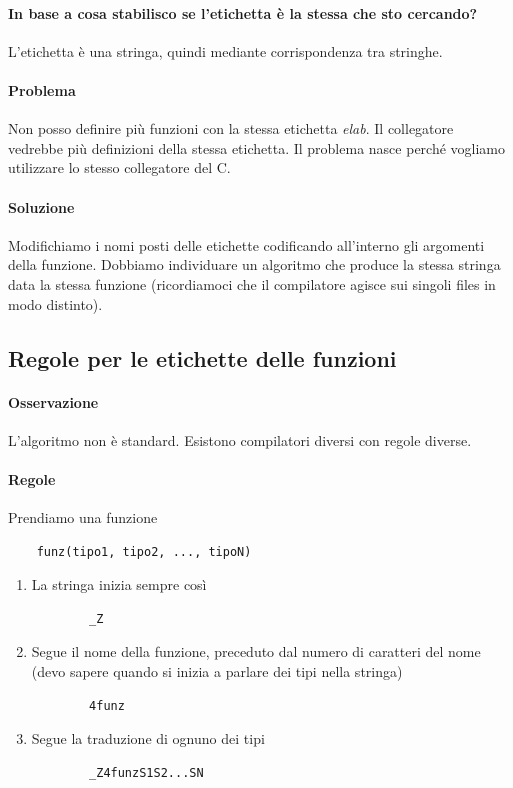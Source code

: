 \paragraph{In base a cosa stabilisco se l'etichetta è la stessa che sto cercando?} L'etichetta è una stringa, quindi mediante corrispondenza tra stringhe. 
\paragraph{Problema} Non posso definire più funzioni con la stessa etichetta \emph{elab}. Il collegatore vedrebbe più definizioni della stessa etichetta. Il problema nasce perché vogliamo utilizzare lo stesso collegatore del C.
\paragraph{Soluzione}  Modifichiamo i nomi posti delle etichette codificando all'interno gli argomenti della funzione. Dobbiamo individuare un algoritmo che produce la stessa stringa data la stessa funzione (ricordiamoci che il compilatore agisce sui singoli files in modo distinto).

\subsection{Regole per le etichette delle funzioni}
\paragraph{Osservazione} L'algoritmo non è standard. Esistono compilatori diversi con regole diverse.
\paragraph{Regole} Prendiamo una funzione
\begin{verbatim}
	funz(tipo1, tipo2, ..., tipoN)
\end{verbatim}
\begin{enumerate}
	\item La stringa inizia sempre così
	\begin{verbatim}
		_Z
	\end{verbatim}
	\item Segue il nome della funzione, preceduto dal numero di caratteri del nome (devo sapere quando si inizia a parlare dei tipi nella stringa)
	\begin{verbatim}
		4funz
	\end{verbatim}
	\item Segue la traduzione di ognuno dei tipi
	\begin{verbatim}
		_Z4funzS1S2...SN
	\end{verbatim}
\end{enumerate}
